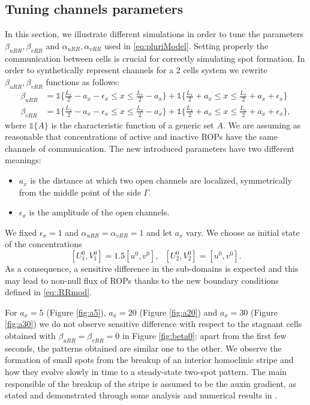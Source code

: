 \subsection{Tuning channels parameters}
In this section, we illustrate different simulations in order to tune the parameters $\beta_{uRR}, \beta_{vRR}$ and $\alpha_{uRR}, \alpha_{vRR}$ used in \eqref{eq:pluriModel}. Setting properly the communication between cells is crucial for correctly simulating spot formation.
In order to synthetically represent channels for a 2 cells system we rewrite $\beta_{uRR}, \beta_{vRR}$ functions as follows:
\begin{equation}\label{eq:beta}\begin{aligned}
    \beta_{uRR} & = \mathbb{1} \Big \{ \frac{L_x}{2} - a_x - \epsilon_x \leq x \leq \frac{L_x}{2} - a_x \Big\}
    + \mathbb{1} \Big\{\frac{L_x}{2} + a_x \leq x \leq \frac{L_x}{2} + a_x + \epsilon_x \Big\} \\
    \beta_{vRR} & = \mathbb{1} \Big\{ \frac{L_x}{2} - a_x - \epsilon_x \leq x \leq \frac{L_x}{2} - a_x \Big\}
    + \mathbb{1} \Big\{\frac{L_x}{2} + a_x \leq x \leq \frac{L_x}{2} + a_x + \epsilon_x \Big\},
\end{aligned}\end{equation}
where $\mathbb{1}\{A\}$ is the characteristic function of a generic set $A$.
We are assuming as reasonable that concentrations of active and inactive ROPs have the same channels of communication. The new introduced parameters have two different meanings:
\begin{itemize}
  \item $a_x$ is the distance at which two open channels are localized, symmetrically from the middle point of the side $\Gamma$.
  \item $\epsilon_x$ is the amplitude of the open channels.
\end{itemize}

We fixed $\epsilon_x = 1$ and $\alpha_{uRR} = \alpha_{vRR}= 1$ and let $a_x$ vary. We choose as initial state of the concentrations
\begin{equation} \label{eq:initstate}
  \left[ U_1^0, V_1^0 \right] = 1.5 \left[u^0,v^0 \right], \ \ \ \left[ U_2^0, V_2^0 \right] = \left[u^0,v^0 \right].
\end{equation}
As a consequence, a sensitive difference in the sub-domains is expected and this may lead to non-null flux of ROPs thanks to the new boundary conditions defined in \eqref{eq::RRmod}.

For $a_x = 5$ (Figure \ref{fig:a5}), $a_x = 20$ (Figure \ref{fig:a20}) and $a_x = 30$ (Figure \ref{fig:a30}) we do not observe sensitive difference with respect to the stagnant cells obtained with $\beta_{uRR} = \beta_{vRR} = 0 $ in Figure \ref{fig:beta0}; apart from the first few seconds, the patterns obtained are similar one to the other.
We observe the formation of small spots from the breakup of an interior homoclinic stripe and how they evolve slowly in time to a steady-state two-spot pattern. The main responsible of the breakup of the stripe is assumed to be the auxin gradient, as stated and demonstrated through some analysis and numerical results in \cite{intra2}.

